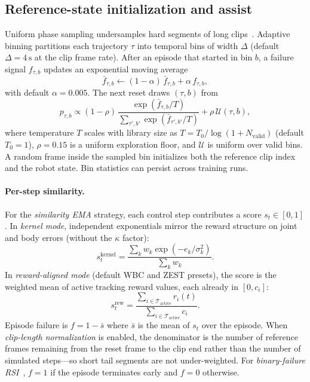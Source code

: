 \documentclass[11pt,a4paper]{article}
\begin{document}
\subsection{Reference-state initialization and assist}
\label{sec:rsi}
Uniform phase sampling undersamples hard segments of long
clips~\citep{liao2025beyondmimic,zest2026}. Adaptive binning partitions each
trajectory $\tau$ into temporal bins of width $\Delta$ (default
$\Delta{=}4\,\mathrm{s}$ at the clip frame rate). After an episode that started
in bin $b$, a failure signal $f_{\tau,b}$ updates an exponential moving average
\begin{equation}
  \bar f_{\tau,b}
    \leftarrow (1-\alpha)\,\bar f_{\tau,b} + \alpha\, f_{\tau,b},
  \label{eq:ema}
\end{equation}
with default $\alpha{=}0.005$. The next reset draws $(\tau,b)$ from
\begin{equation}
  p_{\tau,b}
    \propto (1-\rho)\,
      \frac{\exp(\bar f_{\tau,b}/T)}
           {\sum_{\tau',b'}\exp(\bar f_{\tau',b'}/T)}
    + \rho\, \mathcal{U}(\tau,b),
  \label{eq:sample}
\end{equation}
where temperature $T$ scales with library size as
$T = T_0 / \log(1 + N_{\mathrm{valid}})$ (default $T_0{=}1$), $\rho{=}0.15$ is a
uniform exploration floor, and $\mathcal{U}$ is uniform over valid bins. A random
frame inside the sampled bin initializes both the reference clip index and the
robot state. Bin statistics can persist across training runs.

\paragraph{Per-step similarity.}
For the \emph{similarity EMA} strategy, each control step contributes a score
$s_t\in[0,1]$. In \emph{kernel mode}, independent exponentials mirror the reward
structure on joint and body errors (without the $\kappa$ factor):
\begin{equation}
  s_t^{\mathrm{kernel}}
    = \frac{\sum_k w_k \exp(-e_k/\sigma_k^2)}{\sum_k w_k}.
  \label{eq:sim-kernel}
\end{equation}
In \emph{reward-aligned mode} (default WBC and ZEST presets), the score is the
weighted mean of active tracking reward values, each already in $[0,c_i]$:
\begin{equation}
  s_t^{\mathrm{rew}}
    = \frac{\sum_{i\in\mathcal{T}_{\mathrm{active}}} r_i(t)}
           {\sum_{i\in\mathcal{T}_{\mathrm{active}}} c_i}.
  \label{eq:sim-rew}
\end{equation}
Episode failure is $f = 1 - \bar s$ where $\bar s$ is the mean of $s_t$ over
the episode. When \emph{clip-length normalization} is enabled, the denominator is
the number of reference frames remaining from the reset frame to the clip end
rather than the number of simulated steps---so short tail segments are not
under-weighted. For \emph{binary-failure RSI}~\citep{liao2025beyondmimic},
$f{=}1$ if the episode terminates early and $f{=}0$ otherwise.
\end{document}

